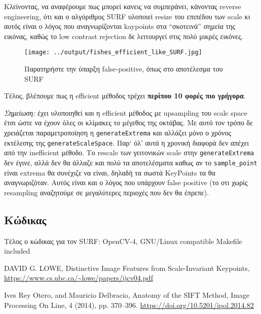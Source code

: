 \documentclass[11pt]{scrartcl} %
\begin{document}
Κλείνοντας, να αναφέρουμε πως μπορεί κανεις να συμπεράνει, κάνοντας reverse engineering, ότι
και ο αλγόριθμος SURF υλοποιεί resize του επιπέδου των scale κι αυτός είναι ο λόγος που αναγνωρίζονται
kaypoints στα ``σκοτεινά'' σημεία της εικόνας, καθώς το low contrast rejection δε λειτουργεί στις
πολύ μικρές εικόνες.

\begin{figure}[H]
  \centerline{\texttt{[image: ../output/fishes\_efficient\_like\_SURF.jpg]}}
  \caption{Παρατηρήστε την ύπαρξη false-positive, όπως στο αποτέλεσμα του SURF}
\end{figure}

Τέλος, βλέπουμε πως η efficient μέθοδος τρέχει \textbf{περίπου 10 φορές πιο γρήγορα}.

\vspace{1cm}
\textit{Σημείωση:} έχει υλοποιηθεί και η efficient μέθοδος με upsampling του scale space
έτσι ώστε να έχουν όλες οι κλίμακες το μέγεθος της οκτάβας. Με αυτό τον τρόπο δε χρειάζεται
παραμετροποίηση η \texttt{generateExtrema} και αλλάζει μόνο ο χρόνος εκτέλεσης της \texttt{generateScaleSpace}.
Παρ` όλ' αυτά η χρονική διαφορά δεν απέχει από την inefficient μέθοδο. Το rescale των γειτονικών
scale στην \texttt{generateExtrema} δεν έγινε, αλλά δεν θα άλλαζε και πολύ τα αποτελέσματα καθως αν το
\texttt{sample\_point} είναι extrema θα συνέχιζε να είναι, δηλαδή τα σωστά KeyPoints τα θα αναγνωριζόταν.
Αυτός είναι και ο λόγος που υπάρχουν false positive (το οτι χωρίς resampling αναζητούμε σε μεγαλύτερες
περιοχές που δεν θα έπρεπε).

\vspace{4cm}
\subsection{Κώδικας}

Τέλος ο κώδικας για τον SURF:
{OpenCV-4, GNU/Linux compatible Makefile included}

\begin{thebibliography}{2}

DAVID G. LOWE, Distinctive Image Features from Scale-Invariant Keypoints,
\url{https://www.cs.ubc.ca/~lowe/papers/ijcv04.pdf}

Ives Rey Otero, and Mauricio Delbracio, Anatomy of the SIFT Method, Image Processing On Line, 4 (2014), pp. 370–396.
\url{https://doi.org/10.5201/ipol.2014.82}

\end{thebibliography}
\end{document}
